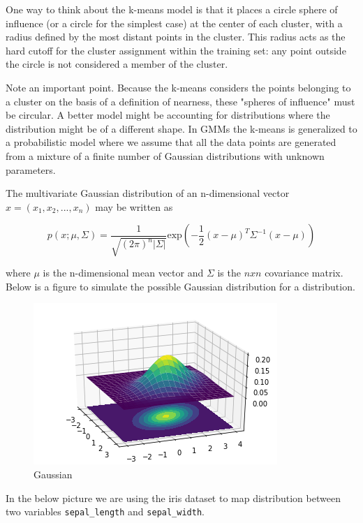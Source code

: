 \documentclass{book}
\begin{document}
One way to think about the k-means model is that it places a circle sphere of influence (or a circle for the simplest case) at the center of each cluster, with a radius defined by the most distant points in the cluster. This radius acts as the hard cutoff for the cluster assignment within the training set: any point outside the circle is not considered a member of the cluster.

Note an important point. Because the k-means considers the points belonging to a cluster on the basis of a definition of nearness, these "spheres of influence" must be circular. A better model might be accounting for distributions where the distribution might be of a different shape. In GMMs the k-means is generalized to a probabilistic model where we assume that all the data points are generated from a mixture of a finite number of Gaussian distributions with unknown parameters.

The multivariate Gaussian distribution of an n-dimensional vector $x = (x_1, x_2, ..., x_n)$ may be written as

\begin{equation}
	p(x; \mu, \Sigma) = \frac{1}{\sqrt{(2\pi)^n |\Sigma|}} \text{exp}(- \frac{1}{2}(x - \mu)^T\Sigma^{-1}(x - \mu))
\end{equation}

where $\mu$ is the n-dimensional mean vector and $\Sigma$ is the $n x n$ covariance matrix. Below is a figure to simulate the possible Gaussian distribution for a distribution.

\begin{figure}[htpb]
	\centering
	\includegraphics[width=0.8\linewidth]{gaussian_dist.png}
	\caption{Gaussian}
	\label{fig:gaussian}
\end{figure}

In the below picture we are using the iris dataset to map distribution between two variables \lstinline{sepal_length} and \lstinline{sepal_width}.
\end{document}
